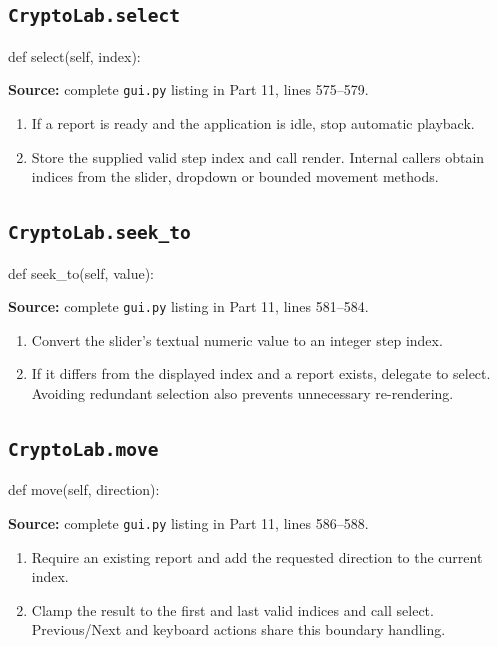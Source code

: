 \subsection{\texttt{CryptoLab.select}}
\begin{lightcode}
def select(self, index):
\end{lightcode}
\noindent\textbf{Source:} complete \texttt{gui.py} listing in Part 11, lines 575--579.
\begin{enumerate}
\item If a report is ready and the application is idle, stop automatic playback.
\item Store the supplied valid step index and call render. Internal callers obtain indices from the slider, dropdown or bounded movement methods.
\end{enumerate}
\subsection{\texttt{CryptoLab.seek\_\allowbreak{}to}}
\begin{lightcode}
def seek_to(self, value):
\end{lightcode}
\noindent\textbf{Source:} complete \texttt{gui.py} listing in Part 11, lines 581--584.
\begin{enumerate}
\item Convert the slider's textual numeric value to an integer step index.
\item If it differs from the displayed index and a report exists, delegate to select. Avoiding redundant selection also prevents unnecessary re-rendering.
\end{enumerate}
\subsection{\texttt{CryptoLab.move}}
\begin{lightcode}
def move(self, direction):
\end{lightcode}
\noindent\textbf{Source:} complete \texttt{gui.py} listing in Part 11, lines 586--588.
\begin{enumerate}
\item Require an existing report and add the requested direction to the current index.
\item Clamp the result to the first and last valid indices and call select. Previous/Next and keyboard actions share this boundary handling.
\end{enumerate}
